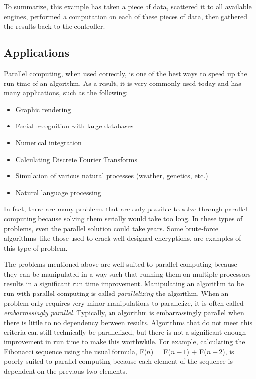 To summarize, this example has taken a piece of data, scattered it to all available engines, performed a computation on each of these pieces of data, then gathered the results back to the controller.

\subsection*{Applications}

Parallel computing, when used correctly, is one of the best ways to speed up the run time of an algorithm.
As a result, it is very commonly used today and has many applications, such as the following:
\begin{itemize}
\item Graphic rendering
\item Facial recognition with large databases
\item Numerical integration
\item Calculating Discrete Fourier Transforms
\item Simulation of various natural processes (weather, genetics, etc.)
\item Natural language processing
\end{itemize}
In fact, there are many problems that are only possible to solve through parallel computing because solving them serially would take too long. 
In these types of problems, even the parallel solution could take years. 
Some brute-force algorithms, like those used to crack well designed encryptions, are examples of this type of problem.

The problems mentioned above are well suited to parallel computing because they can be manipulated in a way such that running them on multiple processors results in a significant run time improvement.
Manipulating an algorithm to be run with parallel computing is called \emph{parallelizing} the algorithm. 
When an problem only requires very minor manipulations to parallelize, it is often called \emph{embarrassingly parallel}.
Typically, an algorithm is embarrassingly parallel when there is little to no dependency between results.
Algorithms that do not meet this criteria can still technically be parallelized, but there is not a significant enough improvement in run time to make this worthwhile. 
For example, calculating the Fibonacci sequence using the usual formula, F($n$) = F($n-1$) + F($n-2$), is poorly suited to parallel computing because each element of the sequence is dependent on the previous two elements.

